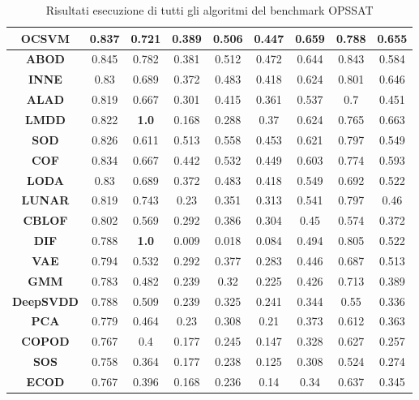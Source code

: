 \begin{table}[h]
\begin{adjustbox}{max width=\textwidth}
\begin{tabular}{|c|c|c|c|c|c|c|c|c|}
         \hline
         \textbf{OCSVM}& 0.837 & 0.721 & 0.389 & 0.506 & 0.447 & 0.659 & 0.788 & 0.655 \\
         \hline
         \textbf{ABOD}& 0.845 & 0.782 & 0.381 & 0.512 & 0.472 & 0.644 & 0.843 & 0.584 \\
         \hline
         \textbf{INNE}& 0.83 & 0.689 & 0.372 & 0.483 & 0.418 & 0.624 & 0.801 & 0.646 \\
         \hline
         \textbf{ALAD}& 0.819 & 0.667 & 0.301 & 0.415 & 0.361 & 0.537 & 0.7 & 0.451 \\
         \hline
         \textbf{LMDD}& 0.822 & \textbf{1.0} & 0.168 & 0.288 & 0.37 & 0.624 & 0.765 & 0.663 \\
         \hline
         \textbf{SOD}& 0.826 & 0.611 & 0.513 & 0.558 & 0.453 & 0.621 & 0.797 & 0.549 \\
         \hline
         \textbf{COF}& 0.834 & 0.667 & 0.442 & 0.532 & 0.449 & 0.603 & 0.774 & 0.593 \\
         \hline
         \textbf{LODA}& 0.83 & 0.689 & 0.372 & 0.483 & 0.418 & 0.549 & 0.692 & 0.522 \\
         \hline
         \textbf{LUNAR}& 0.819 & 0.743 & 0.23 & 0.351 & 0.313 & 0.541 & 0.797 & 0.46 \\
         \hline
         \textbf{CBLOF}& 0.802 & 0.569 & 0.292 & 0.386 & 0.304 & 0.45 & 0.574 & 0.372 \\
         \hline
         \textbf{DIF}& 0.788 & \textbf{1.0} & 0.009 & 0.018 & 0.084 & 0.494 & 0.805 & 0.522 \\
         \hline
         \textbf{VAE}& 0.794 & 0.532 & 0.292 & 0.377 & 0.283 & 0.446 & 0.687 & 0.513 \\
         \hline
         \textbf{GMM}& 0.783 & 0.482 & 0.239 & 0.32 & 0.225 & 0.426 & 0.713 & 0.389 \\
         \hline
         \textbf{DeepSVDD}& 0.788 & 0.509 & 0.239 & 0.325 & 0.241 & 0.344 & 0.55 & 0.336 \\
         \hline
         \textbf{PCA}& 0.779 & 0.464 & 0.23 & 0.308 & 0.21 & 0.373 & 0.612 & 0.363 \\
         \hline
         \textbf{COPOD}& 0.767 & 0.4 & 0.177 & 0.245 & 0.147 & 0.328 & 0.627 & 0.257 \\
         \hline
         \textbf{SOS}& 0.758 & 0.364 & 0.177 & 0.238 & 0.125 & 0.308 & 0.524 & 0.274 \\
         \hline
         \textbf{ECOD}& 0.767 & 0.396 & 0.168 & 0.236 & 0.14 & 0.34 & 0.637 & 0.345 \\
         \hline
        \end{tabular}
    \end{adjustbox}
    \caption{Risultati esecuzione di tutti gli algoritmi del benchmark OPS\textunderscore SAT}
    \label{tab:tabella_inizialeOPS_SAT}   
\end{table}